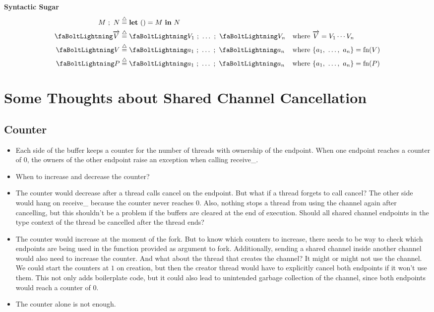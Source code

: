 \documentclass[a4paper,11pt]{article}
\newcommand{\zap}{\text{\faBoltLightning}}
\newcommand{\sugar}{\overset{\triangle}{=}}
\newcommand{\fn}{\text{fn}}
\newcommand{\mbf}[1]{\mathbf{#1}}
\newcommand{\lett}[3]{\mbf{let}~#1 = #2~\mbf{in}~#3}
\newcommand{\toparrow}[1]{\overrightarrow{#1}}
\newcommand{\vv}{\toparrow{V}}
\theoremstyle{plain}
\theoremstyle{nonumberplain}
\begin{document}
\textbf{Syntactic Sugar}
\begin{align*}
  && M~;~N    & \sugar \lett{()}{M}{N}                                                            \\
  && \zap \vv & \sugar \zap V_1~;~\ldots~;~\zap V_n && \text{where}~\vv = V_1 \cdots V_n          \\
  && \zap V   & \sugar \zap a_1~;~\ldots~;~\zap a_n && \text{where}~\{a_1,~\ldots,~a_n\} = \fn(V) \\
  && \zap P   & \sugar \zap a_1~;~\ldots~;~\zap a_n && \text{where}~\{a_1,~\ldots,~a_n\} = \fn(P)
\end{align*}

\section{Some Thoughts about Shared Channel Cancellation}

\subsection{Counter}

\begin{itemize}
  \item Each side of the buffer keeps a counter for the number of threads with ownership of the endpoint. When one endpoint reaches a counter of $0$, the owners of the other endpoint raise an exception when calling receive\_.
  \item When to increase and decrease the counter?
  \item The counter would decrease after a thread calls cancel on the endpoint. But what if a thread forgets to call cancel? The other side would hang on receive\_ because the counter never reaches $0$. Also, nothing stops a thread from using the channel again after cancelling, but this shouldn't be a problem if the buffers are cleared at the end of execution. Should all shared channel endpoints in the type context of the thread be cancelled after the thread ends?
  \item The counter would increase at the moment of the fork. But to know which counters to increase, there needs to be way to check which endpoints are being used in the function provided as argument to fork. Additionally, sending a shared channel inside another channel would also need to increase the counter. And what about the thread that creates the channel? It might or might not use the channel. We could start the counters at $1$ on creation, but then the creator thread would have to explicitly cancel both endpoints if it won't use them. This not only adds boilerplate code, but it could also lead to unintended garbage collection of the channel, since both endpoints would reach a counter of $0$.
  \item The counter alone is not enough.
\end{itemize}
\end{document}
